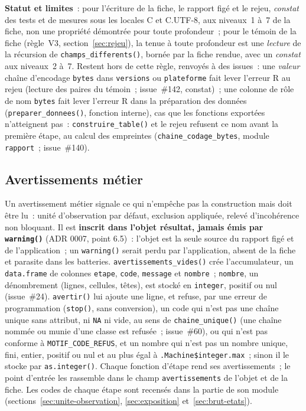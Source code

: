 \documentclass[a4paper,11pt]{article}
\newcommand{\code}[1]{\texttt{\small #1}}
\begin{document}
\textbf{Statut et limites}~: pour l'écriture de la fiche, le rapport figé
et le rejeu, \emph{constat} des tests et de mesures sous les locales C et
C.UTF-8, aux niveaux~1 à~7 de la fiche, non une propriété démontrée pour
toute profondeur~; pour le témoin de la fiche (règle~V3,
section~\ref{sec:rejeu}), la tenue à toute profondeur est une
\emph{lecture} de la récursion de \code{champs\_differents()}, bornée par
la fiche rendue, avec un \emph{constat} aux niveaux~2 à~7. Restent hors de cette règle,
renvoyés à des issues~: une \emph{valeur} chaîne d'encodage \code{bytes}
dans \code{versions} ou \code{plateforme} fait lever l'erreur R au rejeu
(lecture des paires du témoin~; issue~\#142, constat)~; une colonne de
rôle de nom \code{bytes} fait lever l'erreur R dans la préparation des
données (\code{preparer\_donnees()}, fonction interne), cas que les
fonctions exportées n'atteignent pas~: \code{construire\_table()} et le
rejeu refusent ce nom avant la première étape, au calcul des empreintes
(\code{chaine\_codage\_bytes}, module \code{rapport}~; issue~\#140).

\subsection{Avertissements métier}
\label{sec:avertissements}

Un avertissement métier signale ce qui n'empêche pas la construction mais doit
être lu~: unité d'observation par défaut, exclusion appliquée, relevé
d'incohérence non bloquant. Il est \textbf{inscrit dans l'objet résultat,
jamais émis par \code{warning()}} (ADR 0007, point 6.5)~: l'objet est la seule
source du rapport figé et de l'application~; un \code{warning()} serait perdu
par l'application, absent de la fiche et parasite dans les batteries.
\code{avertissements\_vides()} crée l'accumulateur, un \code{data.frame} de
colonnes \code{etape}, \code{code}, \code{message} et \code{nombre}~;
\code{nombre}, un dénombrement (lignes, cellules, têtes), est stocké en
\code{integer}, positif ou nul (issue~\#24). \code{avertir()} lui ajoute une
ligne, et refuse, par une erreur de programmation (\code{stop()}, sans
conversion), un code qui n'est pas une chaîne unique sans attribut, ni
\code{NA} ni vide, au sens de \code{chaine\_unique()} (une chaîne nommée
ou munie d'une classe est refusée~; issue~\#60), ou qui n'est pas conforme à
\code{MOTIF\_CODE\_REFUS}, et un
nombre qui n'est pas un nombre unique, fini, entier, positif ou nul et au plus
égal à \code{.Machine\$integer.max}~; sinon il le stocke par
\code{as.integer()}.
Chaque fonction d'étape rend ses avertissements~; le point d'entrée les
rassemble dans le champ \code{avertissements} de l'objet et de la fiche. Les
codes de chaque étape sont recensés dans la partie de son module
(sections~\ref{sec:unite-observation}, \ref{sec:exposition}
et~\ref{sec:brut-etats}).
\end{document}
